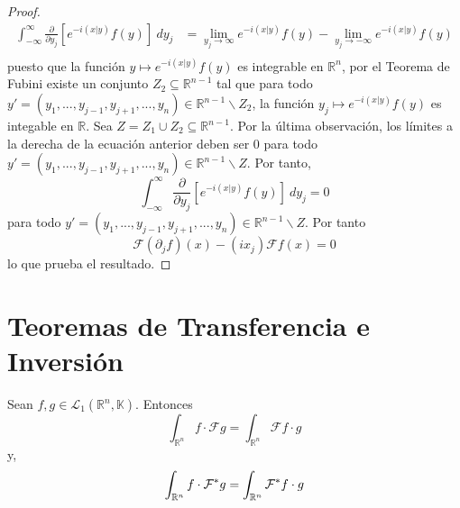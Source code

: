 \documentclass[12pt]{report}
\theoremstyle{largebreak}
\newcommand\pint[2]{\ensuremath{\left(#1\big| #2\right)}}
\newcommand{\fou}[1]{\ensuremath{\mathcal{F}#1}}
\begin{document}
\begin{proof}
        \begin{equation}
            \begin{split}
                \int_{-\infty}^\infty\frac{\partial}{\partial y_j}\left[e^{-i\pint{x}{y}}f(y)\right] \:dy_j&=\lim_{ y_j\rightarrow\infty}e^{ -i\pint{x}{y}}f(y)-\lim_{ y_j\rightarrow-\infty}e^{ -i\pint{x}{y}}f(y)\\
            \end{split}
        \end{equation}
        puesto que la función $y\mapsto e^{ -i\pint{x}{y}}f(y)$ es integrable en $\mathbb{R}^n$, por el Teorema de Fubini existe un conjunto $Z_2\subseteq\mathbb{R}^{ n-1}$ tal que para todo $y'=(y_1,...,y_{ j-1},y_{ j+1},...,y_n)\in\mathbb{R}^{ n-1}\backslash Z_2$, la función $y_j\mapsto e^{ -i\pint{x}{y}}f(y)$ es integable en $\mathbb{R}$. Sea $Z=Z_1\cup Z_2\subseteq\mathbb{R}^{ n-1}$. Por la última observación, los límites a la derecha de la ecuación anterior deben ser $0$ para todo $y'=(y_1,...,y_{ j-1},y_{ j+1},...,y_n)\in\mathbb{R}^{n-1}\backslash Z$. Por tanto,
        \begin{equation*}
            \int_{-\infty}^\infty\frac{\partial}{\partial y_j}\left[e^{-i\pint{x}{y}}f(y)\right] \:dy_j =0
        \end{equation*}
        para todo $y'=(y_1,...,y_{ j-1},y_{ j+1},...,y_n)\in\mathbb{R}^{n-1}\backslash Z$. Por tanto
        \begin{equation*}
            \fou{(\partial_jf)}(x)-(ix_j)\fou{f}(x)=0
        \end{equation*}
        lo que prueba el resultado.
    \end{proof}

    \section{Teoremas de Transferencia e Inversión}

    \begin{theor}
        Sean $f,g\in\mathcal{L}_1(\mathbb{R}^n,\mathbb{K})$. Entonces
        \begin{equation*}
            \int_{\mathbb{R}^n}f\cdot\fou{g}=\int_{\mathbb{R}^n}\fou{f}\cdot g
        \end{equation*}
        y,
        \begin{equation*}
            \int_{\mathbb{R}^n}f\cdot\fou^*{g}=\int_{\mathbb{R}^n}\fou^*{f}\cdot g
        \end{equation*}
    \end{theor}
\end{document}
